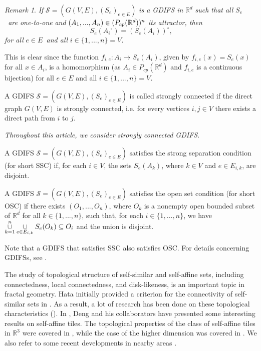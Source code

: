 \documentclass[a4paper,12pt,reqno]{amsart}
\numberwithin{equation}{section}
\theoremstyle{definition}
\theoremstyle{remark}
\newtheorem{remark}[theorem]{Remark}
\numberwithin{equation}{section}
\begin{document}
\begin{remark}\label{RMK1} \textit{If} $\mathcal{S}=(G(V,E),(S_{e})_{e\in E})$ 
\textit{is a GDIFS in} $\mathbb{R}^{d}$ \textit{such that all }$S_{e}$%
\textit{\ are one-to-one} \textit{and }$(A_{1},...,A_{n})\in (P_{cp}(\mathbb{%
R}^{d}))^{n}$ \textit{its attractor, then}%
\[
S_{e}({A_{i}}^\circ)=({S_{e}(A_{i})})^\circ\text{,}
\]%
\textit{for all }$e\in E$\textit{\ and all }$i\in \{1,...,n\}=V$\textit{.}

This is clear since the function $f_{i,e}:A_{i}\rightarrow S_{e}(A_{i})$,
given by $f_{i,e}(x)=S_{e}(x)$ for all $x\in A_{i}$, is a homomorphism (as $%
A_{i}\in P_{cp}(\mathbb{R}^{d})$ and $f_{i,e}$ is a continuous bijection)
for all $e\in E$ and all $i\in \{1,...,n\}=V$\textit{.}\end{remark}

A GDIFS $\mathcal{S}=(G(V,E),(S_{e})_{e\in E})$ is called strongly connected
if the direct graph $G(V,E)$ is strongly connected, i.e. for every vertices $%
i,j\in V$ there exists a direct path from $i$ to $j$.

\textit{Throughout this article, we consider strongly connected GDIFS}.

A GDIFS $\mathcal{S}=(G(V,E),(S_{e})_{e\in E})$ satisfies the strong
separation condition (for short SSC) if, for each $i\in V$, the sets $%
S_{e}(A_{k})$, where $k\in V$ and $e\in E_{i,k}$, are disjoint.

A GDIFS $\mathcal{S}=(G(V,E),(S_{e})_{e\in E})$ satisfies the open set
condition (for short OSC) if there exists $(O_{1},...,O_{n})$, where $%
O_{k}$ is a nonempty open bounded subset of $\mathbb{R}^{d}$ for all $k\in \{1,...,n\}$,
such that, for each $i\in \{1,...,n\}$, we have $\overset{n}{\underset{k=1}{%
\cup }}\underset{e\in E_{i,k}}{\cup }S_{e}(O_{k})\subseteq O_{i}$ and the
union is disjoint.

Note that a GDIFS that satisfies SSC also satisfies OSC.
For details concerning GDIFSs, see \cite{GAE, AF, MW}.

The study of topological structure of self-similar and self-affine sets, including connectedness, local connectedness, and disk-likeness, is an important topic in fractal geometry. Hata initially provided a criterion for the connectivity of self-similar sets in \cite{HATA}. As a result, a lot of research has been done on these topological characteristics (\cite{CB, QR, QR2, IK,JHB,SM}). In \cite{GTD, GT2}, Deng and his collaborators have presented some interesting results on self-affine tiles. The topological properties of the class of self-affine tiles in $\mathbb{R}^3$ were covered in \cite{GTD}, while the case of the higher dimension was covered in \cite{GT2}. We also refer to some recent developments in nearby areas \cite{SD, MK, MNV}.\\
\end{document}
